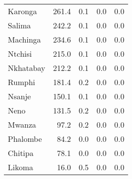 \begin{tabular}{lrrrr}
Karonga        &          261.4 &                 0.1 &            0.0 &                 0.0 \\
Salima         &          242.2 &                 0.1 &            0.0 &                 0.0 \\
Machinga       &          234.6 &                 0.1 &            0.0 &                 0.0 \\
Ntchisi        &          215.0 &                 0.1 &            0.0 &                 0.0 \\
Nkhatabay      &          212.2 &                 0.1 &            0.0 &                 0.0 \\
Rumphi         &          181.4 &                 0.2 &            0.0 &                 0.0 \\
Nsanje         &          150.1 &                 0.1 &            0.0 &                 0.0 \\
Neno           &          131.5 &                 0.2 &            0.0 &                 0.0 \\
Mwanza         &           97.2 &                 0.2 &            0.0 &                 0.0 \\
Phalombe       &           84.2 &                 0.0 &            0.0 &                 0.0 \\
Chitipa        &           78.1 &                 0.0 &            0.0 &                 0.0 \\
Likoma         &           16.0 &                 0.5 &            0.0 &                 0.0 \\
\bottomrule
\end{tabular}
